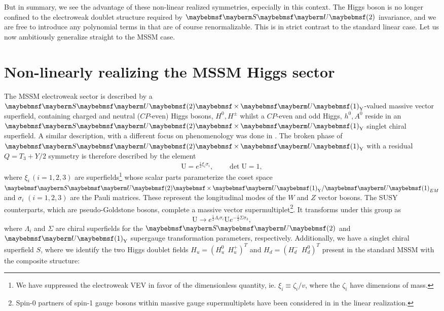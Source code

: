 But in summary, we see the advantage of these non-linear realized symmetries, especially in this context. The Higgs boson is no longer confined to the electroweak doublet structure required by $\SUgroup{2}$ invariance, and we are free to introduce any polynomial terms in that are of course renormalizable. This is in strict contrast to the standard linear case. Let us now ambitiously generalize straight to the MSSM case.

\section{Non-linearly realizing the MSSM Higgs sector}
\label{sec:EffMSSMhiggssector}

The MSSM electroweak sector is described by a $\SUgroup{2} \times \Ugroup{1}_{\text{Y}}$-valued massive vector superfield, containing charged and neutral ($CP$-even) Higgs bosons, $H^0,H^{\pm}$ whilst a $CP$-even and odd Higgs, $h^0,A^0$ reside in an $\SUgroup{2} \times \Ugroup{1}_{\text{Y}}$ singlet chiral superfield. A similar description, with a different focus on phenomenology was done in \cite{RN6}. The broken phase of $\SUgroup{2} \times \Ugroup{1}_{\text{Y}}$ with a residual $Q=T_3+Y/2$ symmetry is therefore described by the element
\begin{equation}
\text{U}=e^{\frac{i}{2}\xi_i\sigma_i},\qquad {\det \text{U}=1},
\end{equation} 
where $\xi_i\,(i=1,2,3)$ are superfields\footnote{We have suppressed the electroweak VEV in favor of the dimensionless quantity, ie. $\xi_i \equiv \zeta_i/v$, where the $\zeta_i$ have dimensions of mass.} whose scalar parts parameterize the coset space $\SUgroup{2} \times \Ugroup{1}_{\text{Y}} / \Ugroup{1}_{EM}$ and $\sigma_i$ $(i=1,2,3)$ are the Pauli matrices. These represent the longitudinal modes of the $W$ and $Z$ vector bosons. The SUSY counterparts, which are pseudo-Goldstone bosons, complete a massive vector supermultiplet\footnote{Spin-0 partners of spin-1 gauge bosons within massive gauge supermultiplets have been considered in \cite{RN665} in the linear realization.}. It transforms under this group as
\begin{equation}
\text{U}\rightarrow e^{\frac{i}{2}\Lambda_{i}\sigma_{i}}\text{U}e^{-\frac{i}{2}\Sigma\sigma_{3}},
\end{equation}
where $\Lambda_i$ and $\Sigma$ are chiral superfields for the $\SUgroup{2}$ and $\Ugroup{1}_{\text{Y}}$ supergauge transformation parameters, respectively. Additionally, we have a singlet chiral superfield $S$, where we identify the two Higgs doublet fields $H_u=(H^0_u~~H^+_u)^T$ and $H_d=(H^-_d~~H^0_d)^T$ present in the standard MSSM with the composite structure:
